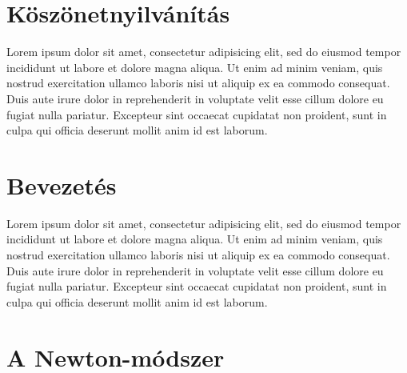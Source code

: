 \documentclass[a4paper,12pt]{report}
\begin{document}

%
%


	\chapter*{Köszönetnyilvánítás}
		Lorem ipsum dolor sit amet, consectetur adipisicing elit, sed do eiusmod tempor incididunt ut labore et dolore magna aliqua. Ut enim ad minim veniam, quis nostrud exercitation ullamco laboris nisi ut aliquip ex ea commodo consequat. Duis aute irure dolor in reprehenderit in voluptate velit esse cillum dolore eu fugiat nulla pariatur. Excepteur sint occaecat cupidatat non proident, sunt in culpa qui officia deserunt mollit anim id est laborum.



%
%

	\chapter{Bevezetés}
		Lorem ipsum dolor sit amet, consectetur adipisicing elit, sed do eiusmod tempor incididunt ut labore et dolore magna aliqua. Ut enim ad minim veniam, quis nostrud exercitation ullamco laboris nisi ut aliquip ex ea commodo consequat. Duis aute irure dolor in reprehenderit in voluptate velit esse cillum dolore eu fugiat nulla pariatur. Excepteur sint occaecat cupidatat non proident, sunt in culpa qui officia deserunt mollit anim id est laborum.
	



%
%


	
	\chapter{A Newton-módszer}
    
    
        
\end{document}
